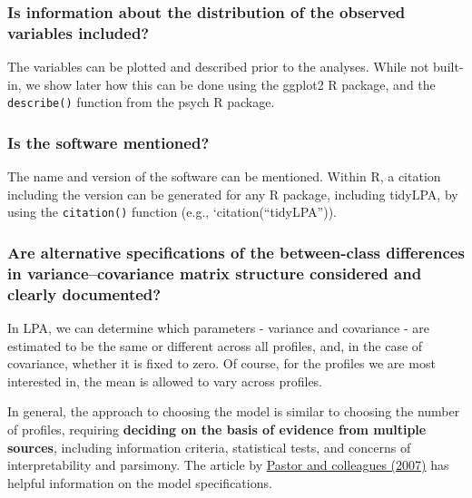 \documentclass[english,man]{apa6}
\begin{document}
\hypertarget{is-information-about-the-distribution-of-the-observed-variables-included}{%
\subsubsection{Is information about the distribution of the observed variables included?}\label{is-information-about-the-distribution-of-the-observed-variables-included}}

The variables can be plotted and described prior to the analyses. While not built-in, we show later how this can be done using the ggplot2 R package, and the \texttt{describe()} function from the psych R package.

\hypertarget{is-the-software-mentioned}{%
\subsubsection{Is the software mentioned?}\label{is-the-software-mentioned}}

The name and version of the software can be mentioned. Within R, a citation including the version can be generated for any R package, including tidyLPA, by using the \texttt{citation()} function (e.g., `citation(\enquote{tidyLPA})).

\hypertarget{are-alternative-specifications-of-the-between-class-differences-in-variancecovariance-matrix-structure-considered-and-clearly-documented}{%
\subsubsection{Are alternative specifications of the between-class differences in variance--covariance matrix structure considered and clearly documented?}\label{are-alternative-specifications-of-the-between-class-differences-in-variancecovariance-matrix-structure-considered-and-clearly-documented}}

In LPA, we can determine which parameters - variance and covariance - are
estimated to be the same or different across all profiles, and, in the case of
covariance, whether it is fixed to zero. Of course, for the profiles we are most
interested in, the mean is allowed to vary across profiles.

In general, the approach to choosing the model is similar to choosing the number
of profiles, requiring \textbf{deciding on the basis of evidence from multiple
sources}, including information criteria, statistical tests, and concerns of
interpretability and parsimony. The article by \href{https://www.sciencedirect.com/science/article/pii/S0361476X06000543}{Pastor and colleagues
(2007)} has
helpful information on the model specifications.
\end{document}
